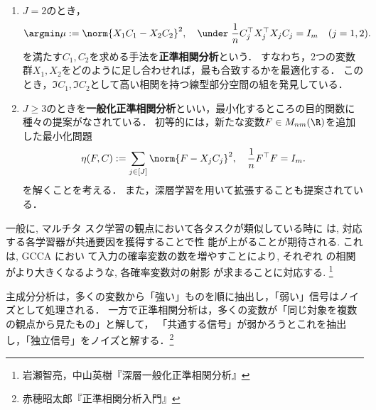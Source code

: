 \documentclass[uplatex,dvipdfmx]{jsreport}
\begin{document}
\begin{definition}\mbox{}
    \begin{enumerate}
        \item $J=2$のとき，
        \[\argmin\mu:=\norm{X_1C_1-X_2C_2}^2,\quad\under\;\frac{1}{n}C^\top_j X^\top_jX_jC_j=I_m\quad(j=1,2).\]
        を満たす$C_1,C_2$を求める手法を\textbf{正準相関分析}という．
        すなわち，2つの変数群$X_1,X_2$をどのように足し合わせれば，最も合致するかを最適化する．
        このとき，$\Im C_1,\Im C_2$として高い相関を持つ線型部分空間の組を発見している．
        \item $J\ge3$のときを\textbf{一般化正準相関分析}といい，最小化するところの目的関数に種々の提案がなされている．
        初等的には，新たな変数$F\in M_{nm}(\R)$を追加した最小化問題
        \[\eta(F,C):=\sum_{j\in[J]}\norm{F-X_jC_j}^2,\quad \frac{1}{n}F^\top F=I_m.\]
        を解くことを考える．
        また，深層学習を用いて拡張することも提案されている．
    \end{enumerate}
\end{definition}
\begin{example}[GCCAの例]
    一般に, マルチタ
    スク学習の観点において各タスクが類似している時に
    は, 対応する各学習器が共通要因を獲得することで性
    能が上がることが期待される. これは, GCCA におい
    て入力の確率変数の数を増やすことにより, それぞれ
    の相関がより大きくなるような, 各確率変数対の射影
    が求まることに対応する. \footnote{岩瀬智亮，中山英樹『深層一般化正準相関分析』}
\end{example}
\begin{remarks}
    主成分分析は，多くの変数から「強い」ものを順に抽出し，「弱い」信号はノイズとして処理される．
    一方で正準相関分析は，多くの変数が「同じ対象を複数の観点から見たもの」と解して，
    「共通する信号」が弱かろうとこれを抽出し，「独立信号」をノイズと解する．\footnote{赤穂昭太郎『正準相関分析入門』}
\end{remarks}
\end{document}
